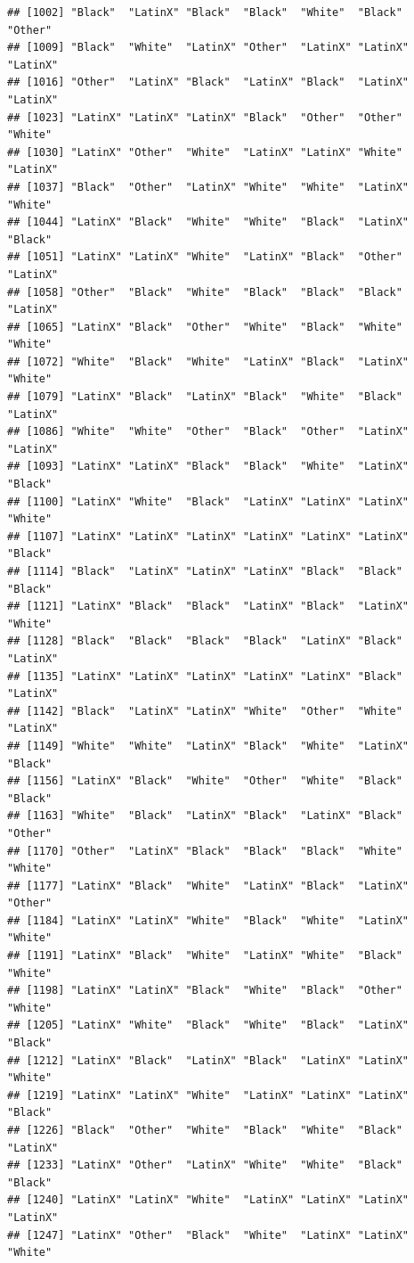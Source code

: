 \documentclass[]{book}
\begin{document}
\begin{verbatim}
## [1002] "Black"  "LatinX" "Black"  "Black"  "White"  "Black"  "Other" 
## [1009] "Black"  "White"  "LatinX" "Other"  "LatinX" "LatinX" "LatinX"
## [1016] "Other"  "LatinX" "Black"  "LatinX" "Black"  "LatinX" "LatinX"
## [1023] "LatinX" "LatinX" "LatinX" "Black"  "Other"  "Other"  "White" 
## [1030] "LatinX" "Other"  "White"  "LatinX" "LatinX" "White"  "LatinX"
## [1037] "Black"  "Other"  "LatinX" "White"  "White"  "LatinX" "White" 
## [1044] "LatinX" "Black"  "White"  "White"  "Black"  "LatinX" "Black" 
## [1051] "LatinX" "LatinX" "White"  "LatinX" "Black"  "Other"  "LatinX"
## [1058] "Other"  "Black"  "White"  "Black"  "Black"  "Black"  "LatinX"
## [1065] "LatinX" "Black"  "Other"  "White"  "Black"  "White"  "White" 
## [1072] "White"  "Black"  "White"  "LatinX" "Black"  "LatinX" "White" 
## [1079] "LatinX" "Black"  "LatinX" "Black"  "White"  "Black"  "LatinX"
## [1086] "White"  "White"  "Other"  "Black"  "Other"  "LatinX" "LatinX"
## [1093] "LatinX" "LatinX" "Black"  "Black"  "White"  "LatinX" "Black" 
## [1100] "LatinX" "White"  "Black"  "LatinX" "LatinX" "LatinX" "White" 
## [1107] "LatinX" "LatinX" "LatinX" "LatinX" "LatinX" "LatinX" "Black" 
## [1114] "Black"  "LatinX" "LatinX" "LatinX" "Black"  "Black"  "Black" 
## [1121] "LatinX" "Black"  "Black"  "LatinX" "Black"  "LatinX" "White" 
## [1128] "Black"  "Black"  "Black"  "Black"  "LatinX" "Black"  "LatinX"
## [1135] "LatinX" "LatinX" "LatinX" "LatinX" "LatinX" "Black"  "LatinX"
## [1142] "Black"  "LatinX" "LatinX" "White"  "Other"  "White"  "LatinX"
## [1149] "White"  "White"  "LatinX" "Black"  "White"  "LatinX" "Black" 
## [1156] "LatinX" "Black"  "White"  "Other"  "White"  "Black"  "Black" 
## [1163] "White"  "Black"  "LatinX" "Black"  "LatinX" "Black"  "Other" 
## [1170] "Other"  "LatinX" "Black"  "Black"  "Black"  "White"  "White" 
## [1177] "LatinX" "Black"  "White"  "LatinX" "Black"  "LatinX" "Other" 
## [1184] "LatinX" "LatinX" "White"  "Black"  "White"  "LatinX" "White" 
## [1191] "LatinX" "Black"  "White"  "LatinX" "White"  "Black"  "White" 
## [1198] "LatinX" "LatinX" "Black"  "White"  "Black"  "Other"  "White" 
## [1205] "LatinX" "White"  "Black"  "White"  "Black"  "LatinX" "Black" 
## [1212] "LatinX" "Black"  "LatinX" "Black"  "LatinX" "LatinX" "White" 
## [1219] "LatinX" "LatinX" "White"  "LatinX" "LatinX" "LatinX" "Black" 
## [1226] "Black"  "Other"  "White"  "Black"  "White"  "Black"  "LatinX"
## [1233] "LatinX" "Other"  "LatinX" "White"  "White"  "Black"  "Black" 
## [1240] "LatinX" "LatinX" "White"  "LatinX" "LatinX" "LatinX" "LatinX"
## [1247] "LatinX" "Other"  "Black"  "White"  "LatinX" "LatinX" "White" 

\end{verbatim}
\end{document}
